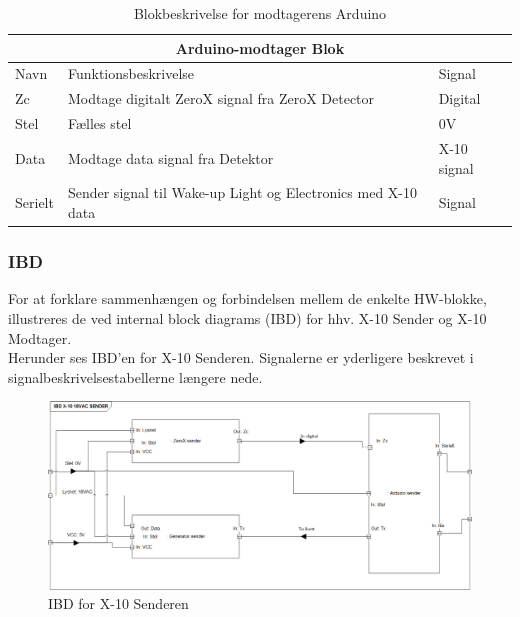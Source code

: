 \documentclass[11pt]{article}
\begin{document}
\begin{table}[H]
\centering
	\begin{tabular}{l|l|l}
	
	\toprule[0.4mm]\midrule \multicolumn{3}{c}{\textbf{Arduino-modtager Blok}}\\
	\midrule[0.4mm] Navn & Funktionsbeskrivelse & Signal\\ \midrule[0.3mm]
	 Zc & Modtage digitalt ZeroX signal fra ZeroX Detector & Digital\\
	 Stel & Fælles stel  & 0V\\
	 Data & Modtage data signal fra Detektor & X-10 signal\\
	 Serielt & Sender signal til Wake-up Light og Electronics med X-10 data & Signal\\
	 \midrule\bottomrule[0.4mm]

	\end{tabular}
	\caption{Blokbeskrivelse for modtagerens Arduino}
	\label{tab: Bloktabel_Arduino_modtager}
\end{table}
\qquad


\pagebreak
\subsubsection{IBD}

For at forklare sammenhængen og forbindelsen mellem de enkelte HW-blokke, illustreres de ved internal block diagrams (IBD) for hhv. X-10 Sender og X-10 Modtager.\\

Herunder ses IBD'en for X-10 Senderen. Signalerne er yderligere beskrevet i signalbeskrivelsestabellerne længere nede. 

\begin{figure}[!ht]
	\centering
	\includegraphics[width=\textwidth]{IBD_sender.png}
	\caption{IBD for X-10 Senderen}
	\label{fig: IBD X-10 Sender}
\end{figure}
\end{document}
